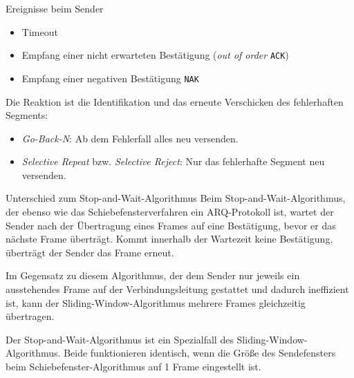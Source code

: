 \begin{defi}{Ereignisse beim Sender}
    \begin{itemize}
        \item Timeout
        \item Empfang einer nicht erwarteten Bestätigung (\emph{out of order} \texttt{ACK})
        \item Empfang einer negativen Bestätigung \texttt{NAK}
    \end{itemize}

    Die Reaktion ist die Identifikation und das erneute Verschicken des fehlerhaften Segments:
    \begin{itemize}
        \item \emph{Go-Back-N}: Ab dem Fehlerfall alles neu versenden.
        \item \emph{Selective Repeat} bzw. \emph{Selective Reject}: Nur das fehlerhafte Segment neu versenden.
    \end{itemize}
\end{defi}

\begin{bonus}{Unterschied zum Stop-and-Wait-Algorithmus}
    Beim Stop-and-Wait-Algorithmus, der ebenso wie das Schiebefensterverfahren ein ARQ-Protokoll ist, wartet der Sender nach der Übertragung eines Frames auf eine Bestätigung, bevor er das nächste Frame überträgt.
    Kommt innerhalb der Wartezeit keine Bestätigung, überträgt der Sender das Frame erneut.

    Im Gegensatz zu diesem Algorithmus, der dem Sender nur jeweils ein ausstehendes Frame auf der Verbindungsleitung gestattet und dadurch ineffizient ist, kann der Sliding-Window-Algorithmus mehrere Frames gleichzeitig übertragen.

    Der Stop-and-Wait-Algorithmus ist ein Spezialfall des Sliding-Window-Algorithmus.
    Beide funktionieren identisch, wenn die Größe des Sendefensters beim Schiebefenster-Algorithmus auf 1 Frame eingestellt ist.
\end{bonus}